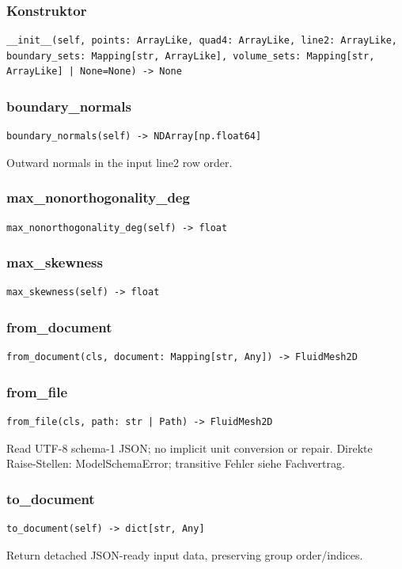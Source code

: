 \subsubsection*{Konstruktor}
\begin{lstlisting}
__init__(self, points: ArrayLike, quad4: ArrayLike, line2: ArrayLike, boundary_sets: Mapping[str, ArrayLike], volume_sets: Mapping[str, ArrayLike] | None=None) -> None
\end{lstlisting}
\subsubsection*{boundary\_normals}
\begin{lstlisting}
boundary_normals(self) -> NDArray[np.float64]
\end{lstlisting}
Outward normals in the input line2 row order.
\subsubsection*{max\_nonorthogonality\_deg}
\begin{lstlisting}
max_nonorthogonality_deg(self) -> float
\end{lstlisting}
\subsubsection*{max\_skewness}
\begin{lstlisting}
max_skewness(self) -> float
\end{lstlisting}
\subsubsection*{from\_document}
\begin{lstlisting}
from_document(cls, document: Mapping[str, Any]) -> FluidMesh2D
\end{lstlisting}
\subsubsection*{from\_file}
\begin{lstlisting}
from_file(cls, path: str | Path) -> FluidMesh2D
\end{lstlisting}
Read UTF-8 schema-1 JSON; no implicit unit conversion or repair.
Direkte Raise-Stellen: ModelSchemaError; transitive Fehler siehe Fachvertrag.
\subsubsection*{to\_document}
\begin{lstlisting}
to_document(self) -> dict[str, Any]
\end{lstlisting}
Return detached JSON-ready input data, preserving group order/indices.
